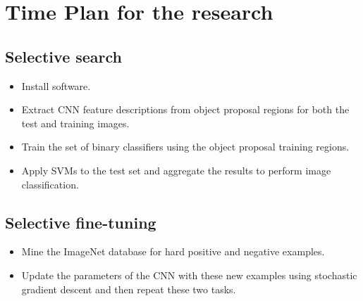\documentclass[a4paper]{article}
\begin{document}
\section{Time Plan for the research}

\subsection{Selective search}
\begin{itemize}
  \item Install software.
  \item Extract CNN feature descriptions from object proposal regions
    for both the test and training images.
  \item Train the set of binary classifiers using the object proposal training regions. 
  \item Apply SVMs to the test set and aggregate the results to
    perform image classification.
\end{itemize}


\subsection{Selective fine-tuning}

\begin{itemize}
  \item Mine the ImageNet database for hard positive and negative examples.
  \item Update the parameters of the CNN with these new examples using
    stochastic gradient descent and then repeat these two tasks.
\end{itemize}





\end{document}
